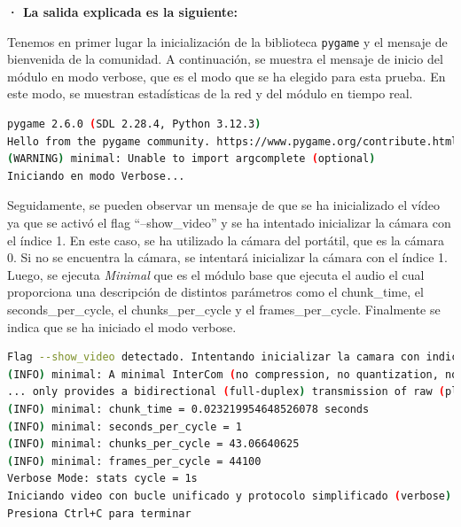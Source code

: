 \textbf{· La salida explicada es la siguiente:}
\vspace{\baselineskip}

Tenemos en primer lugar la inicialización de la biblioteca \texttt{pygame} y el mensaje de bienvenida de la comunidad. A continuación, se muestra el mensaje de inicio del módulo en modo verbose, que es el modo que se ha elegido para esta prueba. En este modo, se muestran estadísticas de la red y del módulo en tiempo real.
\begin{lstlisting}[language=bash,basicstyle=\ttfamily\scriptsize]
pygame 2.6.0 (SDL 2.28.4, Python 3.12.3)
Hello from the pygame community. https://www.pygame.org/contribute.html
(WARNING) minimal: Unable to import argcomplete (optional)
Iniciando en modo Verbose...
\end{lstlisting}

Seguidamente, se pueden observar un mensaje de que se ha inicializado el vídeo ya que se activó el flag ``--show\_video'' y se ha intentado inicializar la cámara con el índice 1. En este caso, se ha utilizado la cámara del portátil, que es la cámara 0. Si no se encuentra la cámara, se intentará inicializar la cámara con el índice 1. Luego, se ejecuta \textit{Minimal} que es el módulo base que ejecuta el audio el cual proporciona una descripción de distintos parámetros como el chunk\_time, el seconds\_per\_cycle, el chunks\_per\_cycle y el frames\_per\_cycle. Finalmente se indica que se ha iniciado el modo verbose.

\begin{lstlisting}[language=bash,basicstyle=\ttfamily\scriptsize]
Flag --show_video detectado. Intentando inicializar la camara con indice 1...
(INFO) minimal: A minimal InterCom (no compression, no quantization, no transform, 
... only provides a bidirectional (full-duplex) transmission of raw (playable) chunks. 
(INFO) minimal: chunk_time = 0.023219954648526078 seconds
(INFO) minimal: seconds_per_cycle = 1
(INFO) minimal: chunks_per_cycle = 43.06640625
(INFO) minimal: frames_per_cycle = 44100
Verbose Mode: stats cycle = 1s
Iniciando video con bucle unificado y protocolo simplificado (verbose)...
Presiona Ctrl+C para terminar
\end{lstlisting}

